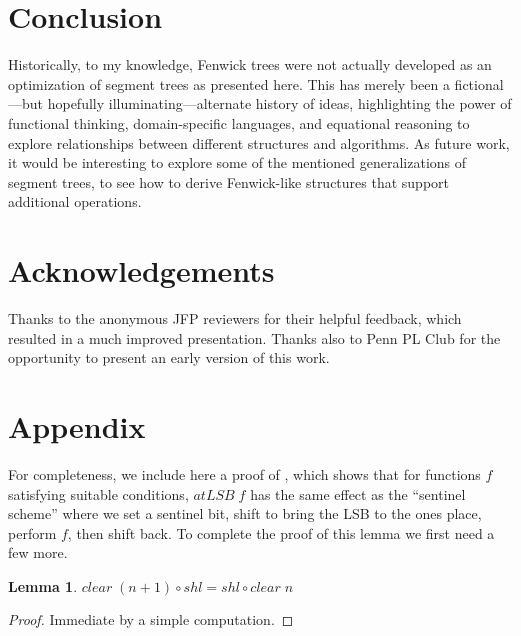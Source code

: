 \documentclass{jfp}
\newcommand{\Varid}[1]{\mathit{#1}}
\providecommand{\pref}{}
\renewcommand{\pref}[1]{\prettyref{#1}}
\newtheorem{lem}[thm]{Lemma}
\theoremstyle{definition}
\theoremstyle{remark}
\newif\ifJFP
\begin{document}
\section{Conclusion}

Historically, to my knowledge, Fenwick trees were not actually
developed as an optimization of segment trees as presented here.  This
has merely been a fictional---but hopefully illuminating---alternate
history of ideas, highlighting the power of functional thinking,
domain-specific languages, and equational reasoning to explore
relationships between different structures and algorithms.  As future
work, it would be interesting to explore some of the mentioned
generalizations of segment trees, to see how to derive Fenwick-like
structures that support additional operations.

\section*{Acknowledgements}

Thanks to the anonymous JFP reviewers for their helpful feedback,
which resulted in a much improved presentation.  Thanks also to Penn PL
Club for the opportunity to present an early version of this work.




\ifJFP
\else
\section*{Appendix}

For completeness, we include here a proof of
\pref{lem:sentinel-scheme}, which shows that for functions $f$
satisfying suitable conditions, \ensuremath{\Varid{atLSB}\;\Varid{f}} has the same effect as the
``sentinel scheme'' where we set a sentinel bit, shift to bring the
LSB to the ones place, perform $f$, then shift back.  To complete the
proof of this lemma we first need a few more.

\begin{lem} \label{lem:clearshl}
  \ensuremath{\Varid{clear}\;(\Varid{n}\mathbin{+}\mathrm{1})\mathbin{\circ}\Varid{shl}\mathrel{=}\Varid{shl}\mathbin{\circ}\Varid{clear}\;\Varid{n}}
\end{lem}
\begin{proof}
  Immediate by a simple computation.
\end{proof}
\end{document}
